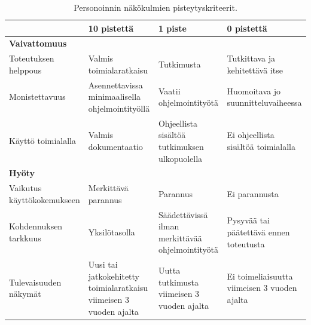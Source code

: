 \documentclass[finnish, 12pt, a4paper, elec, utf8, a-1b, online]{aaltothesis}
\begin{document}
{\tiny\tabcolsep=3pt
\begin{longtable}{p{4cm}|p{3cm}|p{3cm}|p{3cm}}
    \caption{Personoinnin näkökulmien pisteytyskriteerit.\label{table:personalization-comparison-criteria}}                                                                                           \\
                               & 10 pistettä                                                        & 1 piste                                          & 0 pistettä                                   \\
    \midrule
    \textbf{Vaivattomuus}                                                                                                                                                                             \\
    \midrule
    Toteutuksen helppous       & Valmis toimialaratkaisu                                            & Tutkimusta                                       & Tutkittava ja kehitettävä itse               \\
    \midrule
    Monistettavuus             & Asennettavissa minimaalisella ohjelmointityöllä                    & Vaatii ohjelmointityötä                          & Huomoitava jo suunnitteluvaiheessa           \\
    \midrule
    Käyttö toimialalla         & Valmis dokumentaatio                                               & Ohjeellista sisältöä tutkimuksen ulkopuolella    & Ei ohjeellista sisältöä toimialalla          \\
    \midrule
    \textbf{Hyöty}                                                                                                                                                                                    \\
    \midrule
    Vaikutus käyttökokemukseen & Merkittävä parannus                                                & Parannus                                         & Ei parannusta                                \\
    \midrule
    Kohdennuksen tarkkuus      & Yksilötasolla                                                      & Säädettävissä ilman merkittävää ohjelmointityötä & Pysyvää tai päätettävä ennen toteutusta      \\
    \midrule
    Tulevaisuuden näkymät      & Uusi tai jatkokehitetty toimialaratkaisu viimeisen 3 vuoden ajalta & Uutta tutkimusta viimeisen 3 vuoden ajalta       & Ei toimeliaisuutta viimeisen 3 vuoden ajalta \\
\end{longtable}
}
\end{document}
